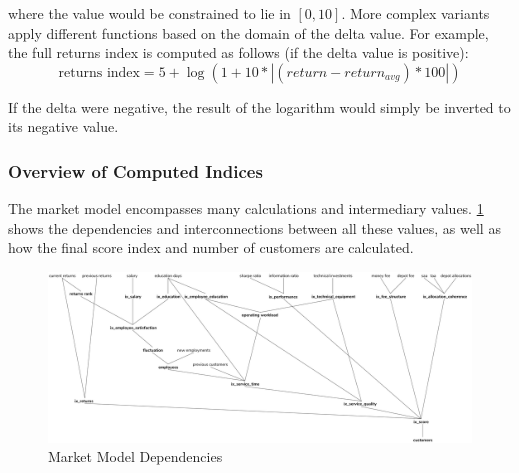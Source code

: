 where the value would be constrained to lie in \([0, 10]\). More complex variants apply different functions based on the domain of the delta value. For example, the full returns index is computed as follows (if the delta value is positive):
\[\text{returns index} = 5 + \log(1 + 10 * |(return - return_{avg}) * 100|)\]

If the delta were negative, the result of the logarithm would simply be inverted to its negative value.

\subsubsection{Overview of Computed Indices}
The market model encompasses many calculations and intermediary values. \ref{fig:market_model_dependencies} shows the dependencies and interconnections between all these values, as well as how the final score index and number of customers are calculated.

\begin{figure}[h!]
  \includegraphics[width=\textwidth]{img/market_model_dependencies.png}
  \caption{Market Model Dependencies}
  \centering
  \label{fig:market_model_dependencies}
\end{figure}


